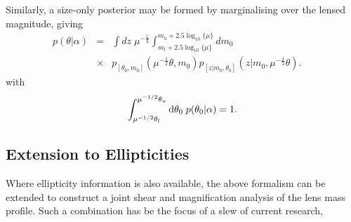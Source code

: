 \documentclass[useAMS,usenatbib,times,letter,amssymb]{mn2e}
\def\be{\begin{equation}}
\def\ee{\end{equation}}
\def\bea{\begin{eqnarray}}
\def\eea{\end{eqnarray}}
\begin{document}
Similarly, a size-only posterior may be formed by marginalising over the lensed magnitude, giving 
\bea\label{eqn:Size-Only_SMD_Posterior}
p(\theta|\alpha) &=& \int dz\; \mu^{-\frac{1}{2}} \int_{m_l+2.5\log_{10}\{\mu\}}^{m_u+2.5\log_{10}\{\mu\}} dm_0\;\\
&\times& p_{[\theta_0, m_0]}\left(\mu^{-\frac{1}{2}}\theta,m_0\right)p_{[z|m_0,\theta_0]}(z|m_0, \mu^{-\frac{1}{2}}\theta).\;\;\;\;\nonumber
\eea
with 
\be
\int^{\mu^{-1/2}\theta_u}_{\mu^{-1/2}\theta_l} {\rm d}\theta_0 \; p(\theta_0|\alpha) = 1.
\ee

\subsection{Extension to Ellipticities}

Where ellipticity information is also available, the above formalism can be extended to construct a joint shear and magnification analysis of the lens mass profile. Such a combination has be the focus of a slew of current research, %
\end{document}
